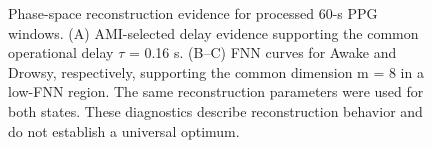 \begin{figure}[p]
\centering
\caption{Phase-space reconstruction evidence for processed 60-s PPG windows. (A) AMI-selected delay evidence supporting the common operational delay $\tau$ = 0.16 s. (B--C) FNN curves for Awake and Drowsy, respectively, supporting the common dimension m = 8 in a low-FNN region. The same reconstruction parameters were used for both states. These diagnostics describe reconstruction behavior and do not establish a universal optimum.}
\label{fig:supp_embedding}
\end{figure}
\clearpage
\endgroup

